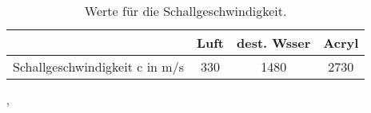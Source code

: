 \begin{table}[H]
  \centering
  \caption{Werte für die Schallgeschwindigkeit.}
  \label{tab:tab1}
    \begin{tabular}{c |c c c}
    \toprule
    & Luft & dest. Wsser& Acryl\\
    \midrule
    Schallgeschwindigkeit c in m/s & 330 & 1480 & 2730\\
    \bottomrule
    \end{tabular}
    \cite{olympus}, \cite{halle}
  \end{table}
